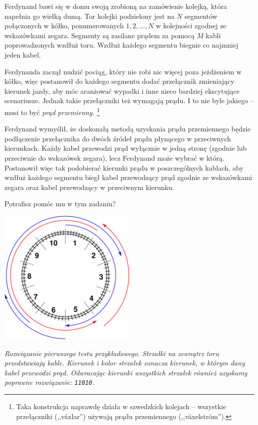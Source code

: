 \ifx\boi\undefined\fi
\def\version{jury-1}
Ferdynand bawi się w domu swoją zrobioną na zamówienie kolejką, która napełnia go wielką dumą.
Tor kolejki podzielony jest na $N$ segmentów połączonych w kółko, ponumerowanych $1, 2, \dots, N$
w kolejności zgodnej ze wskazówkami zegara. Segmenty są zasilane prądem za pomocą $M$ kabli poprowadzonych
wzdłuż toru. Wzdłuż każdego segmentu biegnie co najmniej jeden kabel.

Ferdynanda zaczął nudzić pociąg, który nie robi nic więcej poza jeżdżeniem w kółko, więc 
postanowił do każdego segmentu dodać przełącznik zmieniający kierunek jazdy, aby móc
aranżować wypadki i inne nieco bardziej ekscytujące scenariusze.
Jednak takie przełączniki też wymagają prądu. I to nie byle jakiego -- musi to być \emph{prąd przemienny.}
\footnote{Taka konstrukcja naprawdę działa w szwedzkich kolejach -- wszystkie przełączniki (,,växlar'') używają prądu przemiennego (,,växelström'').}


Ferdynand wymyślił, że doskonałą metodą uzyskania prądu przemiennego
będzie podłączenie przełącznika do dwóch źródeł prądu płynącego w przeciwnych kierunkach.
Każdy kabel przewodzi prąd wyłącznie w jedną stronę (zgodnie lub przeciwnie do wskazówek zegara),
lecz Ferdynand może wybrać w którą. Postanowił więc tak podobierać kierunki prądu w poszczególnych kablach,
aby wzdłuż każdego segmentu biegł kabel przewodzący prąd zgodnie ze wskazówkami zegara oraz kabel przewodzący
w przeciwnym kierunku.

Potrafisz pomóc mu w tym zadaniu?

\vspace{2mm}
\begin{center}
\includegraphics[width=0.5\textwidth]{alternatingfig.pdf}
\end{center}
\vspace{1mm}
{\em Rozwiązanie pierwszego testu przykładowego. Strzałki na zewnątrz toru przedstawiają kable.
Kierunek i kolor strzałek oznacza kierunek, w którym dany kabel przewodzi prąd.
Odwracając kierunki wszystkich strzałek również uzyskamy poprawne rozwiązanie: \texttt{11010}.}

